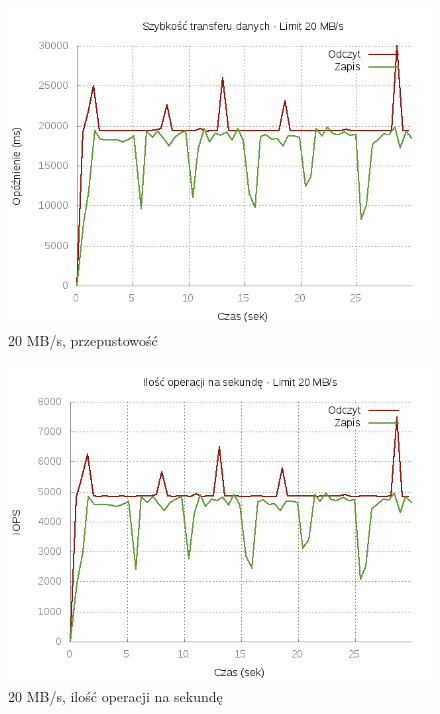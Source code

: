 \begin{figure}[h]
	\centering
	\includegraphics[scale=0.9]{results/20_bw.png}
		\caption{20 MB/s, przepustowość}
    \label{fig:20-bw}
\end{figure}
\begin{figure}[h]
	\centering
	\includegraphics[scale=0.9]{results/20_iops.png}
		\caption{20 MB/s, ilość operacji na sekundę}
    \label{fig:20-iops}
\end{figure}

